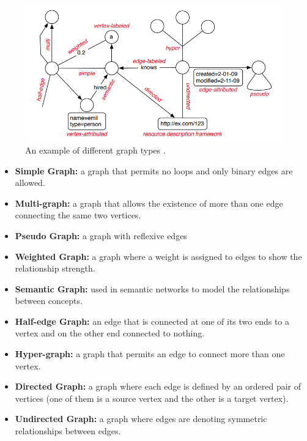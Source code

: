{\begin{figure}
\centering
\includegraphics[width=17cm]{pics/graph-types.png}
\caption{An example of different graph types \cite{DBLP:journals/corr/abs-1006-2361}.}
\label{fig:graph-types}
\end{figure} 

\begin{itemize}  
\item \textbf{Simple Graph:} a graph that permits no loops and only binary edges are allowed.

\item \textbf{Multi-graph:} a graph that allows the existence of more than one edge connecting the same two vertices.

\item \textbf{Pseudo Graph:} a graph with reflexive edges

\item \textbf{Weighted Graph:} a graph where a weight is assigned to edges to show the relationship strength.

\item \textbf{Semantic Graph:} used in semantic networks to model the relationships between concepts.

\item \textbf{Half-edge Graph:} an edge that is connected at one of its two ends to a vertex and on the other end connected to nothing.

\item \textbf{Hyper-graph:} a graph that permits an edge to connect more than one vertex.

\item \textbf{Directed Graph:} a graph where each edge is defined by an ordered pair of vertices (one of them is a source vertex and the other is a target vertex).

\item \textbf{Undirected Graph:} a graph where edges are denoting symmetric relationships between edges.


\end{itemize}}
